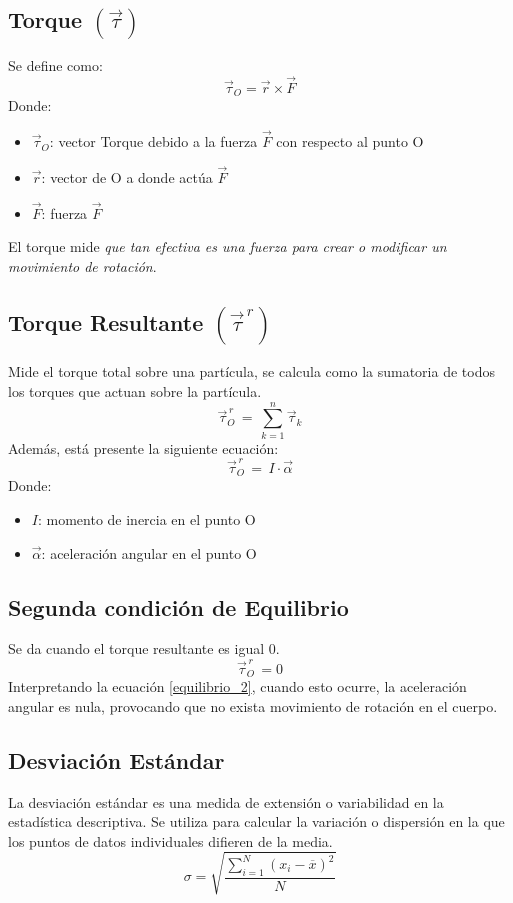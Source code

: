 \documentclass[../main]{subfiles}
\begin{document}
\subsection{Torque $(\vec{\tau})$}
Se define como: \parencite{sears}
\begin{equation} \label{torque}
    \vec{\tau}_O = \vec{r} \times \vec{F}
\end{equation}
Donde:
\begin{itemize}
    \item $\vec{\tau}_O$: vector Torque debido a la fuerza
    $\vec{F}$ con respecto al punto O
    \item $\vec{r}$: vector de O a donde actúa $\vec{F}$
    \item $\vec{F}$: fuerza $\vec{F}$
\end{itemize}
El torque mide \textit{que tan efectiva es una fuerza para crear o modificar
un movimiento de rotación}. \parencite{sears}

\subsection{Torque Resultante $(\vec{\tau}^{\,r})$}
Mide el torque total sobre una partícula, se calcula como la
sumatoria de todos los torques que actuan sobre la partícula.
\begin{equation} \label{torque_resultante1}
    \vec{\tau}_O^{\,r} \, = \, \sum^n_{k=1} \vec{\tau}_k
\end{equation}
Además, está presente la siguiente ecuación:
\begin{equation} \label{torque_resultante2}
    \vec{\tau}_O^{\,r} \, = \, I \cdot  \vec{\alpha}
\end{equation}
Donde:
\begin{itemize}
    \item $I$: momento de inercia en el punto O
    \item $\vec{\alpha}$: aceleración angular en el punto O
\end{itemize}

\subsection{Segunda condición de Equilibrio}
Se da cuando el torque resultante es igual 0.
\begin{equation} \label{equilibrio_2}
    \vec{\tau}_O^{\,r} \, = 0
\end{equation}
Interpretando la ecuación \ref{equilibrio_2}, cuando esto ocurre, la aceleración
angular es nula, provocando que no exista movimiento de rotación en el cuerpo.

\subsection{Desviación Estándar}
La desviación estándar es una medida de extensión o
variabilidad en la estadística descriptiva.
Se utiliza para calcular la variación o dispersión
en la que los puntos de datos individuales difieren
de la media.
\begin{equation} \label{desviacion_eq}
    \sigma = \sqrt{\frac{\sum^N_{i=1} (x_i - \overline{x})^2}{N}}
\end{equation}
\end{document}
